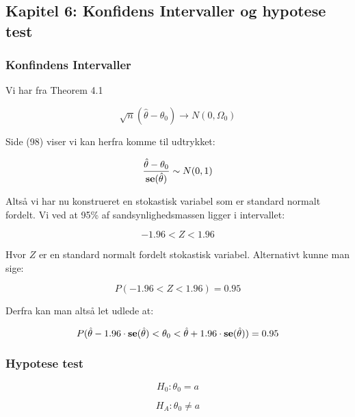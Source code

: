 \subsection{Kapitel 6: Konfidens Intervaller og hypotese test}

\subsubsection{Konfindens Intervaller}

Vi har fra Theorem 4.1

\begin{equation}
    \sqrt{n}(\hat{\theta} - \theta_0) \rightarrow N(0, \Omega_0)
\end{equation}

Side (98) viser vi kan herfra komme til udtrykket:

\begin{equation}
    \frac{\hat{\theta} - \theta_0}{\textbf{se}(\hat{\theta})} \sim N(0,1)
\end{equation}

Altså vi har nu konstrueret en stokastisk variabel som er standard normalt fordelt. Vi ved at 95\% af sandsynlighedsmassen ligger i intervallet:

\begin{equation}
    -1.96 < Z < 1.96
\end{equation}

Hvor $Z$ er en standard normalt fordelt stokastisk variabel. Alternativt kunne man sige:

\begin{equation}
    P(-1.96 < Z < 1.96) = 0.95
\end{equation}

Derfra kan man altså let udlede at:

\begin{equation}
    P(\hat{\theta} - 1.96\cdot\textbf{se}(\hat{\theta}) < \theta_0 < \hat{\theta} + 1.96\cdot\textbf{se}(\hat{\theta})) = 0.95
\end{equation}

\subsubsection{Hypotese test}

\begin{equation}
    H_0 : \theta_0 =a
\end{equation}

\begin{equation}
    H_A : \theta_0 \neq a
\end{equation}


